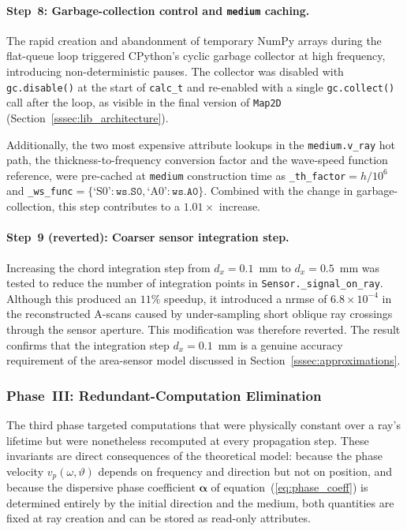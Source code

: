             \paragraph*{Step~8: Garbage-collection control and \texttt{medium} caching.}
            The rapid creation and abandonment of temporary NumPy arrays during the flat-queue loop triggered CPython's cyclic garbage collector at high frequency, introducing non-deterministic pauses. The collector was disabled with \texttt{gc.disable()} at the start of \texttt{calc\_t} and re-enabled with a single \texttt{gc.collect()} call after the loop, as visible in the final version of \texttt{Map2D} (Section~\ref{sssec:lib_architecture}).

            Additionally, the two most expensive attribute lookups in the \texttt{medium.v\_ray} hot path, the thickness-to-frequency conversion factor and the wave-speed function reference, were pre-cached at \texttt{medium} construction time as \texttt{\_th\_factor}$= h/10^6$ and \texttt{\_ws\_func}$= \{\text{`S0'}: \texttt{ws.S0}, \text{`A0'}: \texttt{ws.A0}\}$.  Combined with the change in garbage-collection, this step contributes to a $1.01\times$ increase.

            \paragraph*{Step~9 (reverted): Coarser sensor integration step.}
            Increasing the chord integration step from $d_x = 0.1$~mm to $d_x = 0.5$~mm was tested to reduce the number of integration points in \texttt{Sensor.\_signal\_on\_ray}.  Although this produced an $11\%$ speedup, it introduced a \acrshort{nrmse} of $6.8 \times 10^{-4}$ in the reconstructed A-scans caused by under-sampling short oblique ray crossings through the sensor aperture. This modification was therefore reverted. The result confirms that the integration step $d_x = 0.1$~mm is a genuine accuracy requirement of the area-sensor model discussed in Section~\ref{sssec:approximations}.


        \subsubsection{Phase~III: Redundant-Computation Elimination}
        \label{ssec:opt_redundant}

            The third phase targeted computations that were physically constant over a ray's lifetime but were nonetheless recomputed at every propagation step. These invariants are direct consequences of the theoretical model: because the phase velocity $v_p(\omega,\vartheta)$ depends on frequency and direction but not on position, and because the dispersive phase coefficient $\boldsymbol{\alpha}$ of equation~(\ref{eq:phase_coeff}) is determined entirely by the initial direction and the medium, both quantities are fixed at ray creation and can be stored as read-only attributes.

